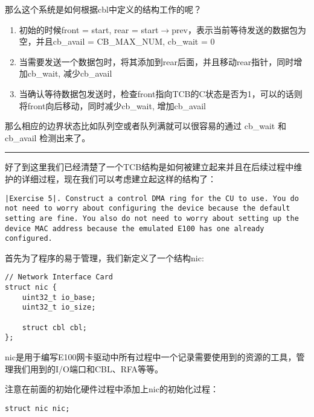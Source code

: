 \documentclass{article}
\begin{document}
\begin{CJK*}{UTF8}{gkai}
\begin{itemize}
{\begin{itemize}
\end{itemize}
}
\end{itemize}

那么这个系统是如何根据cbl中定义的结构工作的呢？

\begin{enumerate}
\item{初始的时候front = start, rear = start$\rightarrow$prev，表示当前等待发送的数据包为空，并且cb\_avail = CB\_MAX\_NUM, cb\_wait = 0}
\item{当需要发送一个数据包时，将其添加到rear后面，并且移动rear指针，同时增加cb\_wait, 减少cb\_avail}
\item{当确认等待数据包发送时，检查front指向TCB的C状态是否为1，可以的话则将front向后移动，同时减少cb\_wait, 增加cb\_avail}

\end{enumerate}

那么相应的边界状态比如队列空或者队列满就可以很容易的通过 cb\_wait 和 cb\_avail 检测出来了。

\vspace{2em}
\hrule
\vspace{2em}

好了到这里我们已经清楚了一个TCB结构是如何被建立起来并且在后续过程中维护的详细过程，现在我们可以考虑建立起这样的结构了：

\begin{lstlisting}[style=exercise]
|Exercise 5|. Construct a control DMA ring for the CU to use. You do not need to worry about configuring the device because the default setting are fine. You also do not need to worry about setting up the device MAC address because the emulated E100 has one already configured.
\end{lstlisting}

首先为了程序的易于管理，我们新定义了一个结构nic:

\begin{lstlisting}[style=ccode, title={\scriptsize \ttfamily \bfseries kern/e100.h}]
// Network Interface Card
struct nic {
    uint32_t io_base;
    uint32_t io_size;

    struct cbl cbl;
};\end{lstlisting}

nic是用于编写E100网卡驱动中所有过程中一个记录需要使用到的资源的工具，管理我们用到的I/O端口和CBL、RFA等等。

注意在前面的初始化硬件过程中添加上nic的初始化过程：

\begin{lstlisting}[style=ccode, title={\scriptsize \ttfamily \bfseries kern/e100.c}]
struct nic nic;


\end{lstlisting}
\end{CJK*}
\end{document}
